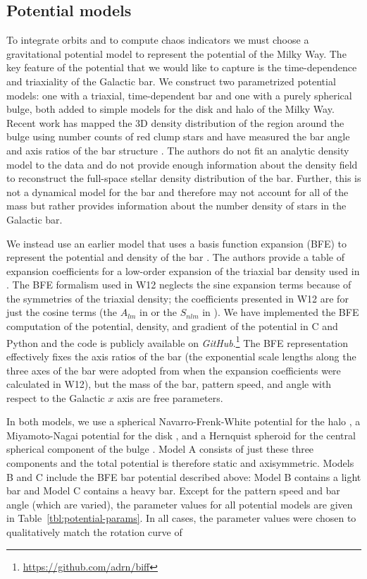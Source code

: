 \documentclass[letterpaper,12pt,preprint]{aastex}
\newcommand{\project}[1]{\textsl{#1}}
\begin{document}
\subsection{Potential models}\label{sec:potential}

To integrate orbits and to compute chaos indicators we must choose a gravitational potential model to represent the potential of the Milky Way. The key feature of the potential that we would like to capture is the time-dependence and triaxiality of the Galactic bar. We construct two parametrized potential models: one with a triaxial, time-dependent bar and one with a purely spherical bulge, both added to simple models for the disk and halo of the Milky Way. Recent work has mapped the 3D density distribution of the region around the bulge using number counts of red clump stars and have measured the bar angle and axis ratios of the bar structure \citep{wegg13}. The authors do not fit an analytic density model to the data and do not provide enough information about the density field to reconstruct the full-space stellar density distribution of the bar. Further, this is not a dynamical model for the bar and therefore may not account for all of the mass but rather provides information about the number density of stars in the Galactic bar.

We instead use an earlier model that uses a basis function expansion (BFE) to represent the potential and density of the bar \citep[][hereafter W12]{wang12}. The authors provide a table of expansion coefficients for a low-order expansion of the triaxial bar density used in \citet{dwek95}. The BFE formalism used in W12 neglects the sine expansion terms because of the symmetries of the triaxial density; the coefficients presented in W12 are for just the cosine terms (the $A_{lm}$ in \citet{hernquist92} or the $S_{nlm}$ in \citet{lowing11}). We have implemented the BFE computation of the potential, density, and gradient of the potential in C and Python and the code is publicly available on \project{GitHub}.\footnote{\url{https://github.com/adrn/biff}} The BFE representation effectively fixes the axis ratios of the bar (the exponential scale lengths along the three axes of the bar were adopted from \cite{dwek95} when the expansion coefficients were calculated in W12), but the mass of the bar, pattern speed, and angle with respect to the Galactic $x$ axis are free parameters. 

In both models, we use a spherical Navarro-Frenk-White potential for the halo \citep{nfw96}, a Miyamoto-Nagai potential for the disk \citep{miyamoto75}, and a Hernquist spheroid for the central spherical component of the bulge \citep{hernquist90}. Model A consists of just these three components and the total potential is therefore static and axisymmetric. Models B and C include the BFE bar potential described above: Model B contains a light bar and Model C contains a heavy bar. Except for the pattern speed and bar angle (which are varied), the parameter values for all potential models are given in Table~\ref{tbl:potential-params}. In all cases, the parameter values were chosen to qualitatively match the rotation curve of \citet{bovy12}
\end{document}
